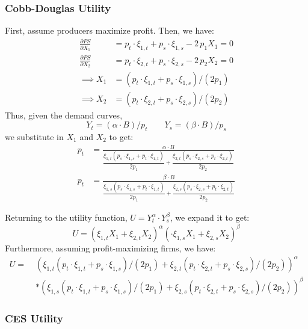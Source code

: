 \documentclass[12pt,a4paper]{extarticle}
\begin{document}
\subsubsection{Cobb-Douglas Utility}

First, assume producers maximize profit. Then, we have:
\begin{align*}
\frac{\partial PS}{\partial X_1} &= p_t \cdot \xi_{1,t} + p_s \cdot \xi_{1,s} - 2\, p_1 X_1 = 0 \\
\frac{\partial PS}{\partial X_2} &= p_t \cdot \xi_{2,t} + p_s \cdot \xi_{2,s} - 2\, p_2 X_2 = 0 \\
\implies X_1 &= \left(p_t \cdot \xi_{1,t} + p_s \cdot \xi_{1,s}\right) / (2 p_1)    \\
\implies X_2 &= \left(p_t \cdot \xi_{2,t} + p_s \cdot \xi_{2,s}\right) / (2 p_2)
\end{align*}
Thus, given the demand curves,
$$Y_t = (\alpha \cdot B)/p_t \qquad Y_s = (\beta \cdot B)/p_s$$
we substitute in $X_1$ and $X_2$ to get:
\begin{align*}
p_t &= \frac{\alpha \cdot B}{\dfrac{\xi_{1,t}(p_s \cdot \xi_{1,s} + p_t \cdot \xi_{1,t})}{2p_1} + \dfrac{\xi_{2,t}(p_s \cdot \xi_{2,s} + p_t \cdot \xi_{2,t})}{2p_2}} \\
p_t &= \frac{\beta \cdot B}{\dfrac{\xi_{1,s}(p_s \cdot \xi_{1,s} + p_t \cdot \xi_{1,t})}{2p_1} + \dfrac{\xi_{2,s}(p_s \cdot \xi_{2,s} + p_t \cdot \xi_{2,t})}{2p_2}}
\end{align*}

Returning to the utility function, $U = Y_t^\alpha \cdot Y_s^\beta$, we expand it to get:
$$U = (\xi_{1,t} X_1 + \xi_{2,t} X_2)^\alpha (\cdot \xi_{1,s} X_1 + \xi_{2,s} X_2)^\beta$$
Furthermore, assuming profit-maximizing firms, we have:
\begin{align*}
U = \; & \left(\xi_{1,t} \left(p_t \cdot \xi_{1,t} + p_s \cdot \xi_{1,s}\right) / (2 p_1) + \xi_{2,t} \left(p_t \cdot \xi_{2,t} + p_s \cdot \xi_{2,s}\right) / (2 p_2) \right)^\alpha \\
&* \left( \xi_{1,s} \left(p_t \cdot \xi_{1,t} + p_s \cdot \xi_{1,s}\right) / (2 p_1) + \xi_{2,s} \left(p_t \cdot \xi_{2,t} + p_s \cdot \xi_{2,s}\right) / (2 p_2) \right)^\beta
\end{align*}


\subsubsection{CES Utility}
\end{document}
